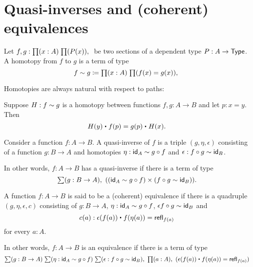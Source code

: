 \section{Quasi-inverses and (coherent) equivalences}
\label{sec:basics-equivalences}

\begin{defn}
Let $f,g:\prd{x:A}{P(x)}$ be two sections of a dependent type $P:A\to\type$. A
homotopy from $f$ to $g$ is a term of type
\begin{equation*}
f\htpy g\defeq \prd{x:A}{f(x)=g(x)}
\end{equation*}
\end{defn}

Homotopies are always natural with respect to paths:

\begin{lem}
Suppose $H:f\htpy g$ is a homotopy between functions $f,g:A\to B$
 and let $p:x=y$. Then
 \begin{equation*}
 H(y)\ct\ap{f}{p}=\ap{g}{p}\ct H(x).
 \end{equation*}
\end{lem}

\begin{defn}
Consider a function $f:A\to B$. A quasi-inverse of $f$ is a triple 
$(g,\eta,\epsilon)$ consisting of a function $g:B\to A$ and homotopies
$\eta:\idfunc[A]\htpy g\circ f$ and $\epsilon:f\circ g\htpy \idfunc[B]$.
\end{defn}

\begin{rm}
In other words, $f:A\to B$ has a quasi-inverse if there is a term of type
\begin{equation*}
\sm{g:B\to A}((\idfunc[A]\htpy g\circ f)\times(f\circ g\htpy\idfunc[B])).
\end{equation*}
\end{rm}

\begin{defn}
A function $f:A\to B$ is said to be a (coherent) equivalence if there is a
quadruple $(g,\eta,\epsilon,c)$ consisting of $g:B\to A$, $\eta:\idfunc[A]\htpy
g\circ f$, $\epsilon f\circ g\htpy\idfunc[B]$ and
\begin{equation*}
c(a):\epsilon(f(a))\ct f(\eta(a))=\refl{f(a)}
\end{equation*}
for every $a:A$. 
\end{defn}

\begin{rm}
In other words, $f:A\to B$ is an equivalence if there is a term of type
\begin{equation*}
\sm{g:B\to A}{\eta:\idfunc[A]\htpy g\circ f}
{\epsilon:f\circ g\htpy \idfunc[B]}\prd{a:A}(\epsilon(f(a))\ct \ap{f}{\eta(a)}=
\refl{f(a)})
\end{equation*}
\end{rm}

